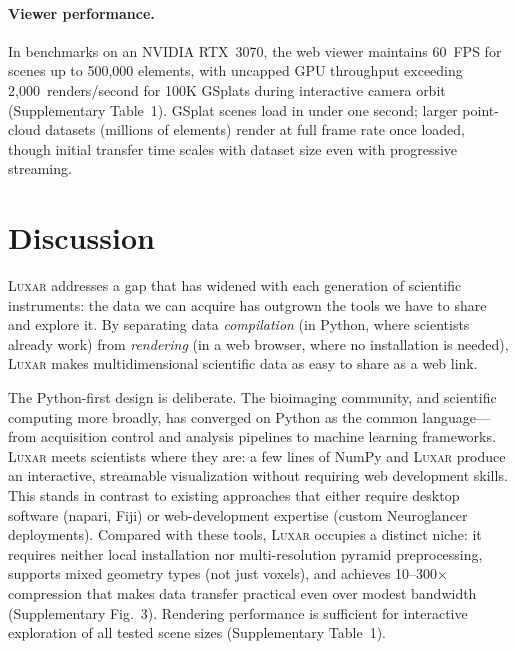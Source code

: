 \documentclass[10pt,twocolumn,letterpaper]{article}
\newcommand{\luxar}{\textsc{Luxar}\xspace}
\begin{document}
\paragraph{Viewer performance.}
In benchmarks on an NVIDIA RTX~3070, the web viewer maintains 60~FPS for scenes up to 500,000 elements, with uncapped GPU throughput exceeding 2,000~renders/second for 100K GSplats during interactive camera orbit (Supplementary Table~1).
GSplat scenes load in under one second; larger point-cloud datasets (millions of elements) render at full frame rate once loaded, though initial transfer time scales with dataset size even with progressive streaming.


\section*{Discussion}

\luxar addresses a gap that has widened with each generation of scientific instruments: the data we can acquire has outgrown the tools we have to share and explore it.
By separating data \emph{compilation} (in Python, where scientists already work) from \emph{rendering} (in a web browser, where no installation is needed), \luxar makes multidimensional scientific data as easy to share as a web link.

The Python-first design is deliberate.
The bioimaging community, and scientific computing more broadly, has converged on Python as the common language\cite{sofroniew2022napari,vanderWalt2014scikit}---from acquisition control and analysis pipelines to machine learning frameworks.
\luxar meets scientists where they are: a few lines of NumPy and \luxar produce an interactive, streamable visualization without requiring web development skills.
This stands in contrast to existing approaches that either require desktop software (napari\cite{sofroniew2022napari}, Fiji\cite{schindelin2012fiji}) or web-development expertise (custom Neuroglancer\cite{maitinshepard2021neuroglancer} deployments).
Compared with these tools, \luxar occupies a distinct niche: it requires neither local installation nor multi-resolution pyramid preprocessing, supports mixed geometry types (not just voxels), and achieves 10--300$\times$ compression that makes data transfer practical even over modest bandwidth (Supplementary Fig.~3).
Rendering performance is sufficient for interactive exploration of all tested scene sizes (Supplementary Table~1).
\end{document}
